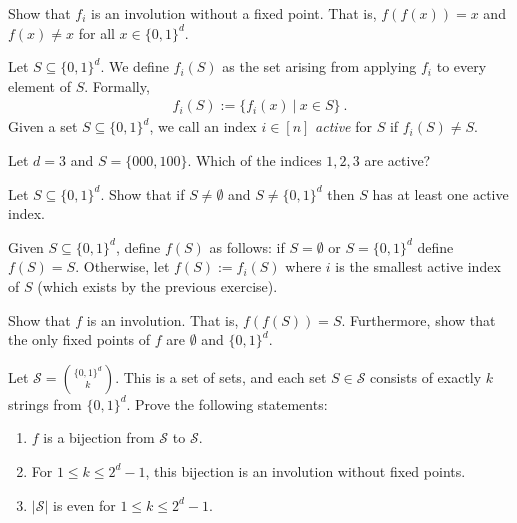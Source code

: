 
\begin{exercise}
 Show that $f_i$ is an involution without a fixed point.
 That is, $f(f(x)) = x$ and $f(x) \ne x$ for all $x \in \{0,1\}^d$.
\end{exercise}

Let $S \subseteq \{0,1\}^d$. We define  $f_i(S)$ as the set arising from applying
$f_i$ to every element of $S$. Formally,
\begin{align*}
f_i(S) := \{ f_i(x) \ | \ x \in S \} \ .
\end{align*}
Given a set $S \subseteq \{0,1\}^d$, we call an index $i \in [n]$ {\em active} for $S$
if $f_i(S) \ne S$. 
\begin{exercise}
Let $d=3$ and $S = \{000, 100\}$. Which of the indices $1,2,3$ are active?
\end{exercise}


\begin{exercise}
 Let $S \subseteq \{0,1\}^d$. Show that if $S \ne \emptyset$ and $S \ne \{0,1\}^d$ then
 $S$ has at least one active index.
\end{exercise}


Given $S \subseteq \{0,1\}^d$, define $f(S)$ as follows: if $S = \emptyset$ or $S = \{0,1\}^d$
define $f(S) = S$. Otherwise, let $f(S) := f_i(S)$ where $i$ is the smallest active
index of $S$ (which exists by the previous exercise).

\begin{exercise}
 Show that $f$ is an involution. That is, $f(f(S)) = S$. Furthermore, show that
 the only fixed points of $f$ are $\emptyset$ and $\{0,1\}^d$.
\end{exercise} 

\begin{exercise}
   Let $\mathcal{S} = { \{0,1\}^d \choose k }$. This is a set of sets, and each set $S \in \mathcal{S}$
   consists of exactly $k$ strings from $\{0,1\}^d$. Prove the following statements: 
   \begin{enumerate}
   \item $f$ is a bijection from $\mathcal{S}$ to $\mathcal{S}$.
   \item For $1 \leq k \leq 2^d-1$, this bijection is an involution
   without fixed points.
   \item $|\mathcal{S}|$ is even for $1 \leq k \leq 2^d-1$.
   \end{enumerate}
\end{exercise}


